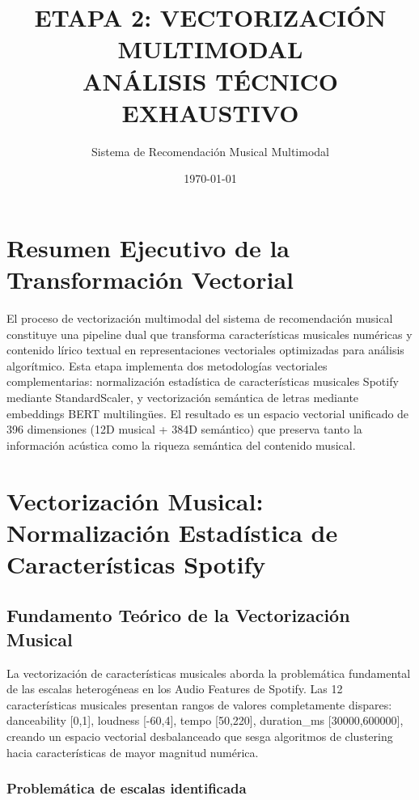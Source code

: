 \documentclass[12pt,a4paper]{article}
\title{ETAPA 2: VECTORIZACIÓN MULTIMODAL\\ANÁLISIS TÉCNICO EXHAUSTIVO}
\author{Sistema de Recomendación Musical Multimodal}
\date{\today}
\begin{document}
\maketitle

\section*{Resumen Ejecutivo de la Transformación Vectorial}

El proceso de vectorización multimodal del sistema de recomendación musical constituye una pipeline dual que transforma características musicales numéricas y contenido lírico textual en representaciones vectoriales optimizadas para análisis algorítmico. Esta etapa implementa dos metodologías vectoriales complementarias: normalización estadística de características musicales Spotify mediante StandardScaler, y vectorización semántica de letras mediante embeddings BERT multilingües. El resultado es un espacio vectorial unificado de 396 dimensiones (12D musical + 384D semántico) que preserva tanto la información acústica como la riqueza semántica del contenido musical.

\section{Vectorización Musical: Normalización Estadística de Características Spotify}

\subsection{Fundamento Teórico de la Vectorización Musical}

La vectorización de características musicales aborda la problemática fundamental de las escalas heterogéneas en los Audio Features de Spotify. Las 12 características musicales presentan rangos de valores completamente dispares: danceability [0,1], loudness [-60,4], tempo [50,220], duration\_ms [30000,600000], creando un espacio vectorial desbalanceado que sesga algoritmos de clustering hacia características de mayor magnitud numérica.

\subsubsection{Problemática de escalas identificada}
\end{document}
